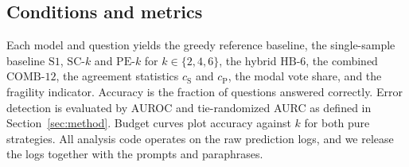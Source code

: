 \subsection{Conditions and metrics}

Each model and question yields the greedy reference baseline, the single-sample baseline $\mathrm{S1}$, $\mathrm{SC}\text{-}k$ and $\mathrm{PE}\text{-}k$ for $k \in \{2, 4, 6\}$, the hybrid $\mathrm{HB}\text{-}6$, the combined $\mathrm{COMB}\text{-}12$, the agreement statistics $c_{\mathrm{S}}$ and $c_{\mathrm{P}}$, the modal vote share, and the fragility indicator. Accuracy is the fraction of questions answered correctly. Error detection is evaluated by AUROC and tie-randomized AURC as defined in Section~\ref{sec:method}. Budget curves plot accuracy against $k$ for both pure strategies. All analysis code operates on the raw prediction logs, and we release the logs together with the prompts and paraphrases.
